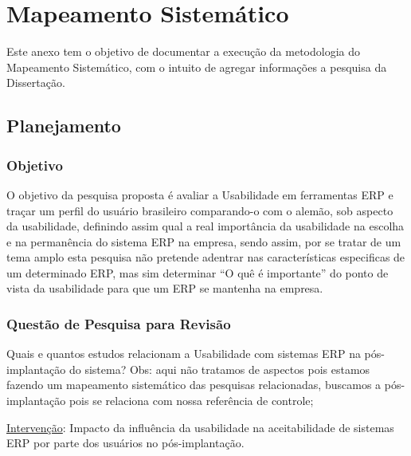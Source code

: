 \chapter{Mapeamento Sistemático}
\setcounter{chapter}{1}
\renewcommand{\thesection}{\arabic{section}}
Este anexo tem o objetivo de documentar a execução da metodologia do Mapeamento Sistemático, com o intuito de agregar informações a pesquisa da Dissertação.

\section{Planejamento} %

\subsection{Objetivo}
\newline
\newline
\indent
O objetivo da pesquisa proposta é avaliar a Usabilidade em ferramentas ERP e traçar um perfil do usuário brasileiro comparando-o com o alemão, sob aspecto da usabilidade, definindo assim qual a real importância da usabilidade na escolha e na permanência do sistema ERP na empresa, sendo assim,  por se tratar de um tema amplo esta pesquisa não pretende adentrar nas características especificas de um determinado ERP, mas sim determinar “O quê é importante” do ponto de vista da usabilidade para que um ERP se mantenha na empresa. 
\newline

\subsection{Questão de Pesquisa para Revisão}
\newline
\newline
\noindent Quais e quantos estudos relacionam a Usabilidade com sistemas ERP na pós-implantação do sistema?\newline
Obs: aqui não tratamos de aspectos pois estamos fazendo um mapeamento sistemático das pesquisas relacionadas, buscamos a pós-implantação pois se relaciona com nossa referência de controle;
\newline

\underline{Intervenção}: Impacto da influência da usabilidade na aceitabilidade de sistemas ERP por parte dos usuários no pós-implantação.
\newline


